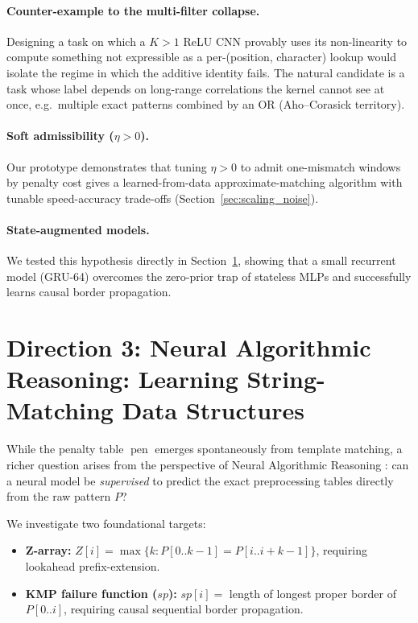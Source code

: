 \documentclass[11pt,a4paper]{article}
\newcommand{\pen}{\operatorname{pen}}
\begin{document}
\paragraph{Counter-example to the multi-filter collapse.}
Designing a task on which a $K > 1$ ReLU CNN provably uses its
non-linearity to compute something not expressible as a per-(position,
character) lookup would isolate the regime in which the additive
identity fails. The natural candidate is a task whose label depends on
long-range correlations the kernel cannot see at once, e.g.\ multiple
exact patterns combined by an OR (Aho--Corasick territory).

\paragraph{Soft admissibility ($\eta > 0$).}
Our prototype demonstrates that tuning $\eta > 0$ to admit one-mismatch windows by
penalty cost gives a learned-from-data approximate-matching algorithm with tunable
speed-accuracy trade-offs (Section~\ref{sec:scaling_noise}).

\paragraph{State-augmented models.}
We tested this hypothesis directly in Section~\ref{sec:direction3}, showing that a small recurrent model (GRU-64) overcomes the zero-prior trap of stateless MLPs and successfully learns causal border propagation.

\section{Direction 3: Neural Algorithmic Reasoning: Learning String-Matching Data Structures}
\label{sec:direction3}

While the penalty table $\pen$ emerges spontaneously from template matching, a richer question arises from the perspective of Neural Algorithmic Reasoning \cite{CLRS2022}: can a neural model be \emph{supervised} to predict the exact preprocessing tables directly from the raw pattern $P$?

We investigate two foundational targets:
\begin{itemize}
    \item \textbf{Z-array:} $Z[i] = \max\{k : P[0..k-1] = P[i..i+k-1]\}$, requiring lookahead prefix-extension.
    \item \textbf{KMP failure function ($sp$):} $sp[i] = $ length of longest proper border of $P[0..i]$, requiring causal sequential border propagation.
\end{itemize}
\end{document}
